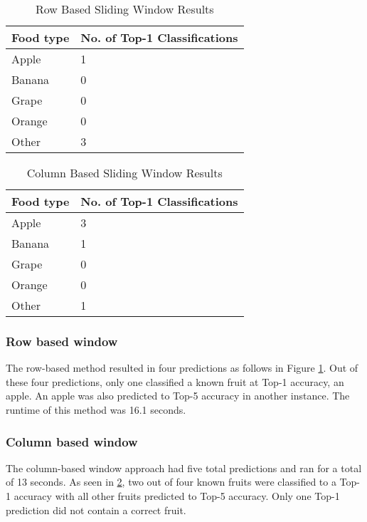 \begin{table}[]
	\centering
	\caption{Row Based Sliding Window Results}
	\label{rowWindowTable}
	\begin{tabular}{|l|l|}
	\hline
		\textbf{Food type} & \textbf{No. of Top-1 Classifications} \\ \hline
		Apple     & 1                      \\ \hline
		Banana    & 0                      \\ \hline
		Grape     & 0                      \\ \hline
		Orange    & 0                      \\ \hline
		Other     & 3                     \\ \hline
	\end{tabular}
\end{table}

\begin{table}[]
	\centering
	\caption{Column Based Sliding Window Results}
	\label{colWindowTable}
	\begin{tabular}{|l|l|}
	\hline
		\textbf{Food type} & \textbf{No. of Top-1 Classifications} \\ \hline
		Apple     & 3                      \\ \hline
		Banana    & 1                      \\ \hline
		Grape     & 0                      \\ \hline
		Orange    & 0                      \\ \hline
		Other     & 1                     \\ \hline
	\end{tabular}
\end{table}

\tocless\subsubsection{Row based window}
The row-based method resulted in four predictions as follows in Figure
\ref{rowWindowTable}. Out of these four predictions, only one classified a known
fruit at Top-1 accuracy, an apple. An apple was also predicted to Top-5 accuracy
in another instance. The runtime of this method was 16.1 seconds.

\tocless\subsubsection{Column based window}
The column-based window approach had five total predictions and ran for a total
of 13 seconds. As seen in \ref{colWindowTable}, two out of four known fruits
were classified to a Top-1 accuracy with all other fruits predicted to Top-5
accuracy. Only one Top-1 prediction did not contain a correct fruit.

